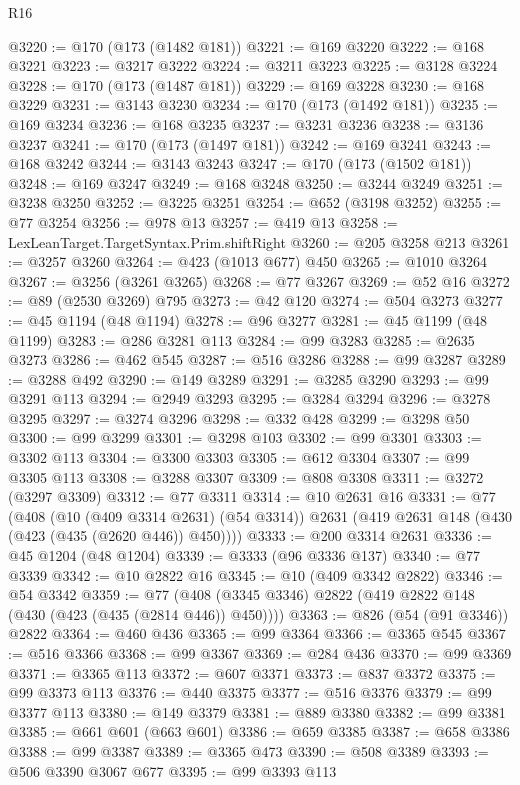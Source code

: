 \begin{lexlean}{R16}
\begin{coremodule}
@3220 := @170 (@173 (@1482 @181))
@3221 := @169 @3220
@3222 := @168 @3221
@3223 := @3217 @3222
@3224 := @3211 @3223
@3225 := @3128 @3224
@3228 := @170 (@173 (@1487 @181))
@3229 := @169 @3228
@3230 := @168 @3229
@3231 := @3143 @3230
@3234 := @170 (@173 (@1492 @181))
@3235 := @169 @3234
@3236 := @168 @3235
@3237 := @3231 @3236
@3238 := @3136 @3237
@3241 := @170 (@173 (@1497 @181))
@3242 := @169 @3241
@3243 := @168 @3242
@3244 := @3143 @3243
@3247 := @170 (@173 (@1502 @181))
@3248 := @169 @3247
@3249 := @168 @3248
@3250 := @3244 @3249
@3251 := @3238 @3250
@3252 := @3225 @3251
@3254 := @652 (@3198 @3252)
@3255 := @77 @3254
@3256 := @978 @13
@3257 := @419 @13
@3258 := LexLeanTarget.TargetSyntax.Prim.shiftRight
@3260 := @205 @3258 @213
@3261 := @3257 @3260
@3264 := @423 (@1013 @677) @450
@3265 := @1010 @3264
@3267 := @3256 (@3261 @3265)
@3268 := @77 @3267
@3269 := @52 @16
@3272 := @89 (@2530 @3269) @795
@3273 := @42 @120
@3274 := @504 @3273
@3277 := @45 @1194 (@48 @1194)
@3278 := @96 @3277
@3281 := @45 @1199 (@48 @1199)
@3283 := @286 @3281 @113
@3284 := @99 @3283
@3285 := @2635 @3273
@3286 := @462 @545
@3287 := @516 @3286
@3288 := @99 @3287
@3289 := @3288 @492
@3290 := @149 @3289
@3291 := @3285 @3290
@3293 := @99 @3291 @113
@3294 := @2949 @3293
@3295 := @3284 @3294
@3296 := @3278 @3295
@3297 := @3274 @3296
@3298 := @332 @428
@3299 := @3298 @50
@3300 := @99 @3299
@3301 := @3298 @103
@3302 := @99 @3301
@3303 := @3302 @113
@3304 := @3300 @3303
@3305 := @612 @3304
@3307 := @99 @3305 @113
@3308 := @3288 @3307
@3309 := @808 @3308
@3311 := @3272 (@3297 @3309)
@3312 := @77 @3311
@3314 := @10 @2631 @16
@3331 := @77
    (@408
      (@10 (@409 @3314 @2631) (@54 @3314))
      @2631
      (@419 @2631 @148 (@430 (@423 (@435 (@2620 @446)) @450))))
@3333 := @200 @3314 @2631
@3336 := @45 @1204 (@48 @1204)
@3339 := @3333 (@96 @3336 @137)
@3340 := @77 @3339
@3342 := @10 @2822 @16
@3345 := @10 (@409 @3342 @2822)
@3346 := @54 @3342
@3359 := @77 (@408 (@3345 @3346) @2822 (@419 @2822 @148 (@430 (@423 (@435 (@2814 @446)) @450))))
@3363 := @826 (@54 (@91 @3346)) @2822
@3364 := @460 @436
@3365 := @99 @3364
@3366 := @3365 @545
@3367 := @516 @3366
@3368 := @99 @3367
@3369 := @284 @436
@3370 := @99 @3369
@3371 := @3365 @113
@3372 := @607 @3371
@3373 := @837 @3372
@3375 := @99 @3373 @113
@3376 := @440 @3375
@3377 := @516 @3376
@3379 := @99 @3377 @113
@3380 := @149 @3379
@3381 := @889 @3380
@3382 := @99 @3381
@3385 := @661 @601 (@663 @601)
@3386 := @659 @3385
@3387 := @658 @3386
@3388 := @99 @3387
@3389 := @3365 @473
@3390 := @508 @3389
@3393 := @506 @3390 @3067 @677
@3395 := @99 @3393 @113

\end{coremodule}
\end{lexlean}

